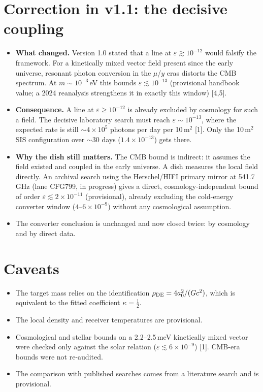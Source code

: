 \documentclass[10pt]{article}
\begin{document}
\section{Correction in v1.1: the decisive coupling}
\begin{itemize}
\item \textbf{What changed.} Version 1.0 stated that a line at $\varepsilon\gtrsim10^{-12}$ would falsify the framework. For a kinetically mixed vector field present since the early universe, resonant photon conversion in the $\mu$/$y$ eras distorts the CMB spectrum. At $m\sim10^{-3}$\,eV this bounds $\varepsilon\lesssim10^{-13}$ (provisional handbook value; a 2024 reanalysis strengthens it in exactly this window) [4,5].
\item \textbf{Consequence.} A line at $\varepsilon\ge10^{-12}$ is already excluded by cosmology for such a field. The decisive laboratory search must reach $\varepsilon\sim10^{-13}$, where the expected rate is still $\sim4\times10^5$ photons per day per 10\,m$^2$ [1]. Only the 10\,m$^2$ SIS configuration over $\sim$30 days ($1.4\times10^{-13}$) gets there.
\item \textbf{Why the dish still matters.} The CMB bound is indirect: it assumes the field existed and coupled in the early universe. A dish measures the local field directly. An archival search using the Herschel/HIFI primary mirror at 541.7\,GHz (lane CFG799, in progress) gives a direct, cosmology-independent bound of order $\varepsilon\lesssim2\times10^{-11}$ (provisional), already excluding the cold-energy converter window ($4$--$6\times10^{-9}$) without any cosmological assumption.
\item The converter conclusion is unchanged and now closed twice: by cosmology and by direct data.
\end{itemize}

\section{Caveats}
\begin{itemize}
\item The target mass relies on the identification $\rho_{\rm DE}=4a_0^2/(Gc^2)$, which is equivalent to the fitted coefficient $\kappa=\tfrac12$.
\item The local density and receiver temperatures are provisional.
\item Cosmological and stellar bounds on a 2.2--2.5\,meV kinetically mixed vector were checked only against the solar relation ($\varepsilon\lesssim6\times10^{-9}$) [1]. CMB-era bounds were not re-audited.
\item The comparison with published searches comes from a literature search and is provisional.
\end{itemize}
\end{document}

